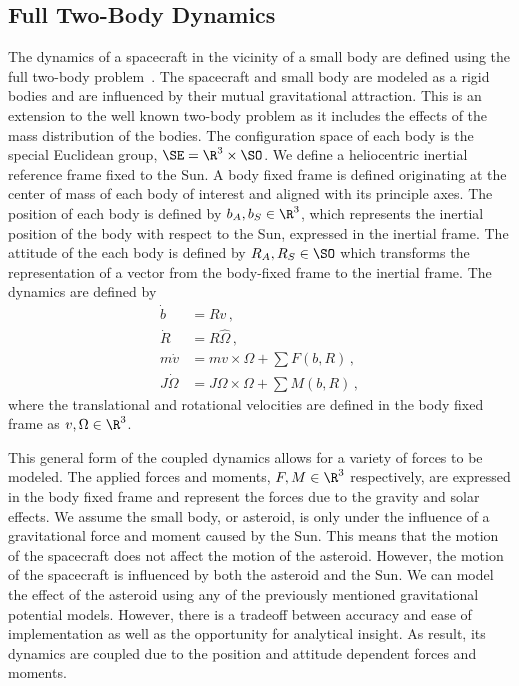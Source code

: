 \documentclass[11pt]{article} %
\begin{document}
\subsection{Full Two-Body Dynamics}
The dynamics of a spacecraft in the vicinity of a small body are defined using the full two-body problem~\cite{fahnestock2006}.
The spacecraft and small body are modeled as a rigid bodies and are influenced by their mutual gravitational attraction.
This is an extension to the well known two-body problem as it includes the effects of the mass distribution of the bodies.
The configuration space of each body is the special Euclidean group, \( \SE = \R^3 \times \SO \). 
We define a heliocentric inertial reference frame fixed to the Sun. 
A body fixed frame is defined originating at the center of mass of each body of interest and aligned with its principle axes.
The position of each body is defined by \( b_A, b_S \in \R^3 \), which represents the inertial position of the body with respect to the Sun, expressed in the inertial frame. 
The attitude of the each body is defined by \( R_A, R_S \in \SO\) which transforms the representation of a vector from the body-fixed frame to the inertial frame.
The dynamics are defined by
\begin{align*}
	\dot{b} &= R v \, ,\\
	\dot{R} &= R \hat{\Omega} \, ,\\
	m \dot{v} &= m v \times \Omega + \sum F(b, R) \, ,\\
	J \dot{\Omega}  &= J \Omega \times \Omega +  \sum M(b, R) \, ,
\end{align*}
where the translational and rotational velocities are defined in the body fixed frame as \( v , \Omega \in \R^3 \).

This general form of the coupled dynamics allows for a variety of forces to be modeled.
The applied forces and moments, \( F, M \in \R^3 \) respectively, are expressed in the body fixed frame and represent the forces due to the gravity and solar effects.
We assume the small body, or asteroid, is only under the influence of a gravitational force and moment caused by the Sun.
This means that the motion of the spacecraft does not affect the motion of the asteroid. 
However, the motion of the spacecraft is influenced by both the asteroid and the Sun.
We can model the effect of the asteroid using any of the previously mentioned gravitational potential models. 
However, there is a tradeoff between accuracy and ease of implementation as well as the opportunity for analytical insight. 
As result, its dynamics are coupled due to the position and attitude dependent forces and moments.
\end{document}
